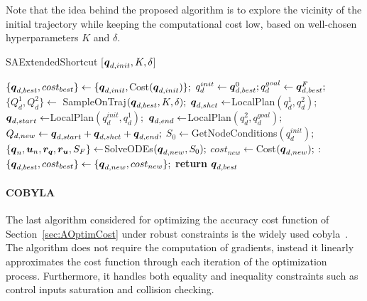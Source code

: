 Note that the idea behind the proposed algorithm is to explore the vicinity of the initial trajectory while keeping the computational cost low, based on well-chosen hyperparameters $K$ and $\delta$.

\begin{algorithm}[htp]
    \caption{SAExtendedShortcut [$\boldsymbol{q}_{d,init}, K, \delta$]}\label{alg:extendedshct}
    \begin{algorithmic}[1]
        \State $\{\boldsymbol{q}_{d,best}, cost_{best}\} \gets \{\boldsymbol{q}_{d,init}, $Cost$(\boldsymbol{q}_{d,init})\};$
        \State $q_d^{init} \gets \boldsymbol{q}_{d,best}^0; q_d^{goal} \gets \boldsymbol{q}_{d,best}^F;$
            \State $\{Q_d^{1}, Q_d^{2}\} \gets$ SampleOnTraj$(\boldsymbol{q}_{d,best}, K, \delta);$
                    \State $\boldsymbol{q}_{d,shct} \gets $LocalPlan$(q_d^{1}, q_d^{2});$
                        \State $\boldsymbol{q}_{d,start} \gets $LocalPlan$(q_d^{init}, q_d^{1});$
                        \State $\boldsymbol{q}_{d,end} \gets $LocalPlan$(q_d^{2}, q_d^{goal});$
                        \State $Q_{d,new} \gets \boldsymbol{q}_{d,start}+\boldsymbol{q}_{d,shct}+\boldsymbol{q}_{d,end};$
                    \EndIf
                \EndFor 
            \EndFor
                \State $S_0 \gets $GetNodeConditions$(q_d^{init});$
                \State $\{\boldsymbol{q}_n, \boldsymbol{u}_n, \boldsymbol{r_q}, \boldsymbol{r_u}, S_F\}  \gets $SolveODEs$(\boldsymbol{q}_{d,new}, S_0);$
                \State $cost_{new} \gets $Cost$(\boldsymbol{q}_{d,new});$
                :   
                        \State $\{\boldsymbol{q}_{d,best}, cost_{best}\} \gets \{\boldsymbol{q}_{d,new}, cost_{new}\};$
                    \EndIf
                \EndIf
            \EndFor 
        \EndWhile
    \State \textbf{return} $\boldsymbol{q}_{d,best}$
    \end{algorithmic}
\end{algorithm}

\paragraph{COBYLA}

The last algorithm considered for optimizing the accuracy cost function of Section~\ref{sec:AOptimCost} under robust constraints is the widely used \gls{cobyla}~\cite{cCOBYLA}.
The algorithm does not require the computation of gradients, instead it linearly approximates the cost function through each iteration of the optimization process.
Furthermore, it handles both equality and inequality constraints such as control inputs saturation and collision checking. 

